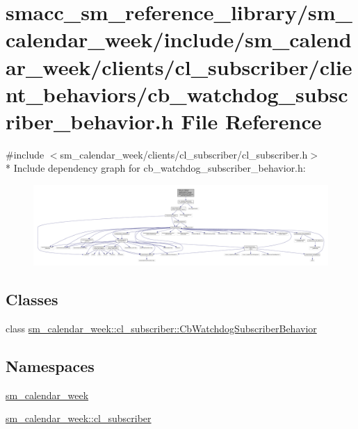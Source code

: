 \hypertarget{sm__calendar__week_2include_2sm__calendar__week_2clients_2cl__subscriber_2client__behaviors_2cb_36e06d0e8a2b4ac94bf461d1b035e759}{}\section{smacc\+\_\+sm\+\_\+reference\+\_\+library/sm\+\_\+calendar\+\_\+week/include/sm\+\_\+calendar\+\_\+week/clients/cl\+\_\+subscriber/client\+\_\+behaviors/cb\+\_\+watchdog\+\_\+subscriber\+\_\+behavior.h File Reference}
\label{sm__calendar__week_2include_2sm__calendar__week_2clients_2cl__subscriber_2client__behaviors_2cb_36e06d0e8a2b4ac94bf461d1b035e759}
{\ttfamily \#include $<$sm\+\_\+calendar\+\_\+week/clients/cl\+\_\+subscriber/cl\+\_\+subscriber.\+h$>$}\\*
Include dependency graph for cb\+\_\+watchdog\+\_\+subscriber\+\_\+behavior.\+h\+:
\nopagebreak
\begin{figure}[H]
\begin{center}
\leavevmode
\includegraphics[width=350pt]{sm__calendar__week_2include_2sm__calendar__week_2clients_2cl__subscriber_2client__behaviors_2cb_1448ff78ed4f375082d09f5f66e7dfd5}
\end{center}
\end{figure}
\subsection*{Classes}
\begin{DoxyCompactItemize}
\item 
class \hyperlink{classsm__calendar__week_1_1cl__subscriber_1_1CbWatchdogSubscriberBehavior}{sm\+\_\+calendar\+\_\+week\+::cl\+\_\+subscriber\+::\+Cb\+Watchdog\+Subscriber\+Behavior}
\end{DoxyCompactItemize}
\subsection*{Namespaces}
\begin{DoxyCompactItemize}
\item 
 \hyperlink{namespacesm__calendar__week}{sm\+\_\+calendar\+\_\+week}
\item 
 \hyperlink{namespacesm__calendar__week_1_1cl__subscriber}{sm\+\_\+calendar\+\_\+week\+::cl\+\_\+subscriber}
\end{DoxyCompactItemize}
